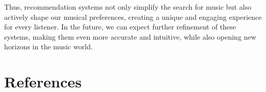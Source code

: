 \documentclass[12pt,a4paper]{article}
\begin{document}
Thus, recommendation systems not only simplify the search for music but also actively shape our musical preferences, creating a unique and engaging experience for every listener. In the future, we can expect further refinement of these systems, making them even more accurate and intuitive, while also opening new horizons in the music world.

\newpage
\section{References}


\end{document}
